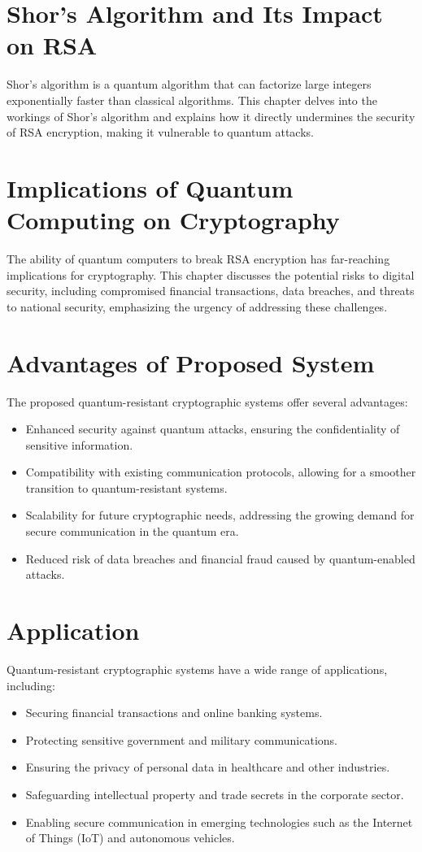 \documentclass[12pt,a4paper]{report}
\begin{document}
\chapter{Shor's Algorithm and Its Impact on RSA}
\label{chap:shors_algorithm}
Shor's algorithm is a quantum algorithm that can factorize large integers exponentially faster than classical algorithms. This chapter delves into the workings of Shor's algorithm and explains how it directly undermines the security of RSA encryption, making it vulnerable to quantum attacks.

\chapter{Implications of Quantum Computing on Cryptography}
The ability of quantum computers to break RSA encryption has far-reaching implications for cryptography. This chapter discusses the potential risks to digital security, including compromised financial transactions, data breaches, and threats to national security, emphasizing the urgency of addressing these challenges.

\chapter{Advantages of Proposed System}
The proposed quantum-resistant cryptographic systems offer several advantages:
\begin{itemize}
    \item Enhanced security against quantum attacks, ensuring the confidentiality of sensitive information.
    \item Compatibility with existing communication protocols, allowing for a smoother transition to quantum-resistant systems.
    \item Scalability for future cryptographic needs, addressing the growing demand for secure communication in the quantum era.
    \item Reduced risk of data breaches and financial fraud caused by quantum-enabled attacks.
\end{itemize}

\chapter{Application}
Quantum-resistant cryptographic systems have a wide range of applications, including:
\begin{itemize}
    \item Securing financial transactions and online banking systems.
    \item Protecting sensitive government and military communications.
    \item Ensuring the privacy of personal data in healthcare and other industries.
    \item Safeguarding intellectual property and trade secrets in the corporate sector.
    \item Enabling secure communication in emerging technologies such as the Internet of Things (IoT) and autonomous vehicles.
\end{itemize}
\end{document}
